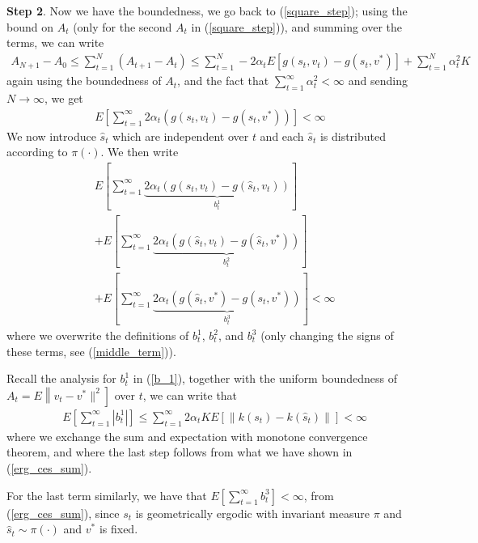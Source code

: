 \documentclass[twoside,11pt]{article}
\begin{document}
{\bf Step 2}. Now we have the boundedness, we go back to (\ref{square_step}); using the bound on $A_t$ (only for the second $A_t$ in (\ref{square_step})), and summing over the terms, we can write
\begin{align*}
A_{N+1}-A_0 \leq \sum_{t=1}^N \left(A_{t+1} - A_t\right)  \leq \sum_{t=1}^N  -2\alpha_t  E\left[ g(s_t,v_t) - g(s_t,v^*) \right]   + \sum_{t=1}^N  \alpha_t^2K
\end{align*}
again using the boundedness of $A_t$, and the fact that $\sum_{t=1}^\infty\alpha_t^2 <\infty$  and sending $N\to\infty$, we get
\begin{align*}
  E\left[ \sum_{t=1}^\infty 2\alpha_t  \left(g(s_t,v_t) - g(s_t,v^*)\right)\right]  <\infty
\end{align*}
We now introduce $\hat{s}_t$ which are independent over $t$ and each $\hat{s}_t$ is distributed according to $\pi(\cdot)$. We then write
\begin{align}\label{fin_sum}
  &E\left[ \sum_{t=1}^\infty \underbrace{2\alpha_t   \left(g(s_t,v_t) - g(\hat{s}_t,v_t)\right)}_{b_t^1}\right]  \nonumber\\
&+   E\left[ \sum_{t=1}^\infty   \underbrace{ 2\alpha_t \left(g(\hat{s}_t,v_t) - g(\hat{s}_t,v^*)\right)}_{b_t^2}\right] \nonumber \\
& +   E\left[ \sum_{t=1}^\infty  \underbrace{ 2\alpha_t  \left(g(\hat{s}_t,v^*) - g(s_t,v^*)\right)}_{b_t^3}\right]  <\infty
\end{align}
where we overwrite the definitions of $b_t^1$, $b_t^2$, and $b_t^3$ (only changing the signs of these terms, see (\ref{middle_term})). 

Recall the analysis for $b_t^1$ in (\ref{b_1}), together with the uniform boundedness of $A_t= E\left \|v_t - v^*\|^2  \right]$ over $t$, we can write that 
\begin{align*}
  &E\left[ \sum_{t=1}^\infty \left|b_t^1\right|\right]  \leq   \sum_{t=1}^\infty 2\alpha_t  K  E\left[\|k(s_t) - k(\hat{s}_t)\|  \right]  <\infty
\end{align*}
where we exchange the sum and expectation with monotone convergence theorem, and where the last step follows from what we have shown in (\ref{erg_ces_sum}). 


For the last term similarly, we have that $E\left[ \sum_{t=1}^\infty b_t^3\right] <\infty$, from (\ref{erg_ces_sum}), since $s_t$ is geometrically ergodic with invariant measure $\pi$ and $\hat{s}_t\sim \pi(\cdot)$ and $v^*$ is fixed. 
\end{document}
